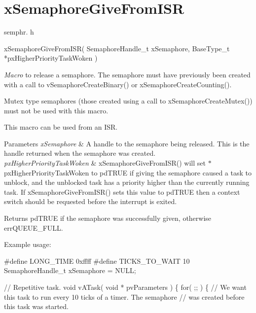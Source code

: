 \hypertarget{group__x_semaphore_give_from_i_s_r}{}\section{x\+Semaphore\+Give\+From\+I\+S\+R}
\label{group__x_semaphore_give_from_i_s_r}
semphr. h 
\begin{DoxyPre}
xSemaphoreGiveFromISR(
                         SemaphoreHandle\_t xSemaphore,
                         BaseType\_t *pxHigherPriorityTaskWoken
                     )\end{DoxyPre}


{\itshape Macro} to release a semaphore. The semaphore must have previously been created with a call to v\+Semaphore\+Create\+Binary() or x\+Semaphore\+Create\+Counting().

Mutex type semaphores (those created using a call to x\+Semaphore\+Create\+Mutex()) must not be used with this macro.

This macro can be used from an I\+S\+R.


\begin{DoxyParams}{Parameters}
{\em x\+Semaphore} & A handle to the semaphore being released. This is the handle returned when the semaphore was created.\\
\hline
{\em px\+Higher\+Priority\+Task\+Woken} & x\+Semaphore\+Give\+From\+I\+S\+R() will set $\ast$px\+Higher\+Priority\+Task\+Woken to pd\+T\+R\+U\+E if giving the semaphore caused a task to unblock, and the unblocked task has a priority higher than the currently running task. If x\+Semaphore\+Give\+From\+I\+S\+R() sets this value to pd\+T\+R\+U\+E then a context switch should be requested before the interrupt is exited.\\
\hline
\end{DoxyParams}
\begin{DoxyReturn}{Returns}
pd\+T\+R\+U\+E if the semaphore was successfully given, otherwise err\+Q\+U\+E\+U\+E\+\_\+\+F\+U\+L\+L.
\end{DoxyReturn}
Example usage\+: 
\begin{DoxyPre}
\#define LONG\_TIME 0xffff
\#define TICKS\_TO\_WAIT  10
SemaphoreHandle\_t xSemaphore = NULL;\end{DoxyPre}



\begin{DoxyPre}// Repetitive task.
void vATask( void * pvParameters )
\{
   for( ;; )
   \{
       // We want this task to run every 10 ticks of a timer.  The semaphore
       // was created before this task was started.\end{DoxyPre}



